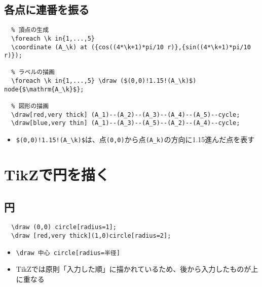 \documentclass[16pt,b5paper]{article}
\begin{document}
\subsection{各点に連番を振る}


\begin{lstlisting}
  % 頂点の生成
  \foreach \k in{1,...,5}
  \coordinate (A_\k) at ({cos((4*\k+1)*pi/10 r)},{sin((4*\k+1)*pi/10 r)});

  % ラベルの描画
  \foreach \k in{1,...,5} \draw ($(0,0)!1.15!(A_\k)$) node{$\mathrm{A_\k}$};

  % 図形の描画
  \draw[red,very thick] (A_1)--(A_2)--(A_3)--(A_4)--(A_5)--cycle;
  \draw[blue,very thin] (A_1)--(A_3)--(A_5)--(A_2)--(A_4)--cycle;
\end{lstlisting}

\begin{itemize}
  \item \verb|$(0,0)!1.15!(A_\k)$|は、点\verb|(0,0)|から点\verb|(A_k)|の方向に1.15進んだ点を表す
\end{itemize}

\section{TikZで円を描く}

\subsection{円}


\begin{lstlisting}
  \draw (0,0) circle[radius=1];
  \draw [red,very thick](1,0)circle[radius=2];
\end{lstlisting}

\begin{itemize}
  \item \verb|\draw 中心 circle[radius=半径]|
  \item TikZでは原則「入力した順」に描かれているため、後から入力したものが上に重なる
\end{itemize}
\end{document}
